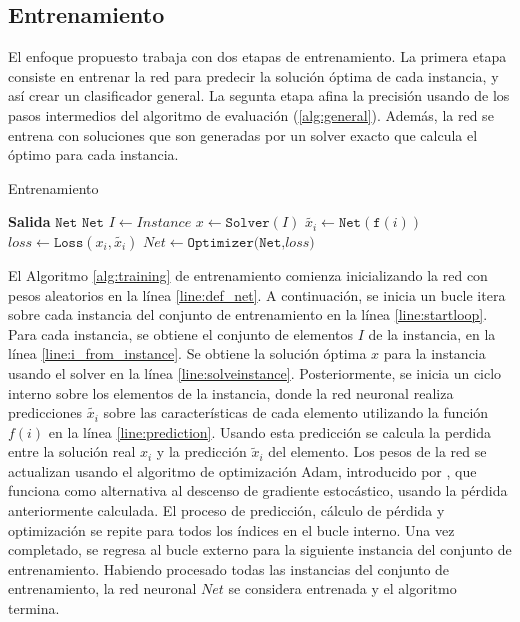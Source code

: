 \documentclass[spanish, a4paper, 12pt, openany,final]{book}
\begin{document}
\subsection{Entrenamiento}

El enfoque propuesto trabaja con dos etapas de entrenamiento. La primera etapa consiste en entrenar la red para predecir la solución óptima de cada instancia, y así crear un clasificador general. La segunta etapa afina la precisión usando de los pasos intermedios del algoritmo de evaluación (\ref{alg:general}). Además, la red se entrena con soluciones que son generadas por un solver exacto que calcula el óptimo para cada instancia. 

\begin{algorithm}[H]
	\caption{Entrenamiento}\label{alg:training}
	\begin{algorithmic}[1]
		\Statex \textbf{Salida} $\texttt{Net}$
		\label{line:loss}
		\State $\texttt{Net}$ \label{line:def_net}
		   \label{line:startloop}
		\State $I \gets Instance$ \label{line:i_from_instance}
		\State $x \gets \texttt{Solver}(I)$\label{line:solveinstance}
		 \label{line:startinnerloop}
		\State $\tilde{x_i} \gets \texttt{Net}(\texttt{f}(i))$   \label{line:prediction}
		\State $loss \gets \texttt{Loss}(x_i,\tilde{x_i})$ \label{line:calculateloss}
		\State $Net \gets \texttt{Optimizer(Net,$loss$)}$ \label{line:optimizationstep}
		\EndFor \label{line:endinnerloop}
		\EndFor \label{line:endloop}
	\end{algorithmic}
\end{algorithm}

El Algoritmo \ref{alg:training} de entrenamiento comienza inicializando la red con pesos aleatorios en la línea \ref{line:def_net}. A continuación, se inicia un bucle itera sobre cada instancia del conjunto de entrenamiento en la línea \ref{line:startloop}. Para cada instancia, se obtiene el conjunto de elementos $I$ de la instancia, en la línea \ref{line:i_from_instance}. Se obtiene la solución óptima $x$ para la instancia usando el solver en la línea \ref{line:solveinstance}. Posteriormente, se inicia un ciclo interno sobre los elementos de la instancia, donde la red neuronal realiza predicciones $\tilde{x_i}$ sobre las características de cada elemento utilizando la función \(f(i)\) en la línea \ref{line:prediction}.
Usando esta predicción se calcula la perdida entre la solución real $x_i$ y la predicción $\tilde{x}_i$ del elemento. Los pesos de la red se actualizan usando el algoritmo de optimización Adam, introducido por \cite{kingma2017adam}, que funciona como alternativa al descenso de gradiente estocástico, usando la pérdida anteriormente calculada. El proceso de predicción, cálculo de pérdida y optimización se repite para todos los índices en el bucle interno. Una vez completado, se regresa al bucle externo para la siguiente instancia del conjunto de entrenamiento. Habiendo procesado todas las instancias del conjunto de entrenamiento, la red neuronal $Net$ se considera entrenada y el algoritmo termina.
\end{document}
